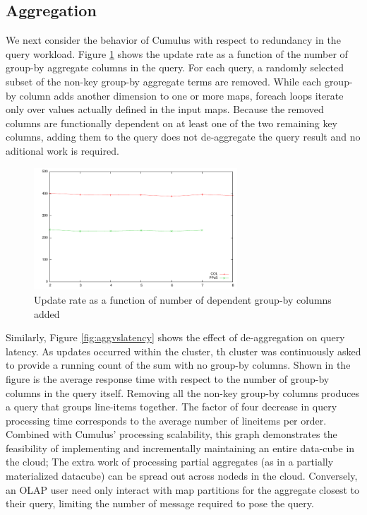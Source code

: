 \subsection{Aggregation}
We next consider the behavior of Cumulus with respect to redundancy in the query workload.  Figure \ref{fig:aggvsupdates} shows the update rate as a function of the number of group-by aggregate columns in the query.  For each query, a randomly selected subset of the non-key group-by aggregate terms are removed.  While each group-by column adds another dimension to one or more maps, foreach loops iterate only over values actually defined in the input maps.  Because the removed columns are functionally dependent on at least one of the two remaining key columns, adding them to the query does not de-aggregate the query result and no aditional work is required.

\begin{figure}
\begin{center}
\includegraphics[width=3.0in]{images/aggvsupdates.pdf}
\caption{Update rate as a function of number of dependent group-by columns added}
\label{fig:aggvsupdates}
\end{center}
\end{figure}

Similarly, Figure \ref{fig:aggvslatency} shows the effect of de-aggregation on query latency.  As updates occurred within the cluster, th cluster was continuously asked to provide a running count of the sum with no group-by columns.  Shown in the figure is the average response time with respect to the number of group-by columns in the query itself.  Removing all the non-key group-by columns produces a query that groups line-items together.  The factor of four decrease in query processing time corresponds to the average number of lineitems per order.  Combined with Cumulus' processing scalability, this graph demonstrates the feasibility of implementing and incrementally maintaining an entire data-cube in the cloud; The extra work of processing partial aggregates (as in a partially materialized datacube) can be spread out across nodeds in the cloud.  Conversely, an OLAP user need only interact with map partitions for the aggregate closest to their query, limiting the number of message required to pose the query.

